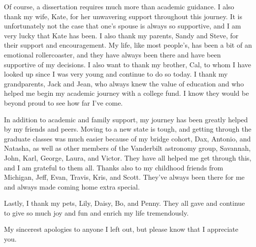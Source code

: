 \begin{doublespace}
Of course, a dissertation requires much more than academic guidance.
I also thank my wife, Kate, for her unwavering support throughout this journey.
It is unfortunately not the case that one's spouse is always so
supportive, and I am very lucky that Kate has been.
I also thank my parents, Sandy and Steve, for their support and encouragement.
My life, like most people's, has been a bit of an emotional rollercoaster,
and they have always been there and have been supportive of my decisions.
I also want to thank my brother, Cal, to whom I have looked up since I was
very young and continue to do so today.
I thank my grandparents, Jack and Jean, who always knew the value
of education and who helped me begin my academic journey with a college fund.
I know they would be beyond proud to see how far I've come.

In addition to academic and family support, my journey has been greatly
helped by my friends and peers.
Moving to a new state is tough, and
getting through the graduate classes was much easier because of my
bridge cohort, Dax, Antonio, and Natasha, as well as other members of the
Vanderbilt astronomy group, Savannah, John, Karl, George, Laura, and Victor.
They have all helped me get through this, and I am grateful to them all.
Thanks also to my childhood friends from Michigan,
Jeff, Evan, Travis, Kris, and Scott.
They've always been there for me and always made coming home extra special.

Lastly, I thank my pets, Lily, Daisy, Bo, and Penny.
They all gave and continue to give so much joy and fun and enrich
my life tremendously.

My sincerest apologies to anyone I left out, but please know that I appreciate
you.

\end{doublespace}
